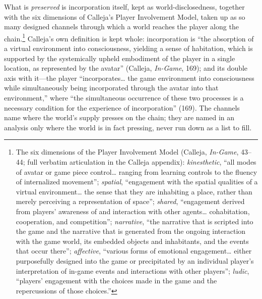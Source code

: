\documentclass{article}
\begin{document}
What is \textit{preserved} is incorporation itself, kept as world-disclosedness, together with the six dimensions of Calleja's Player Involvement Model, taken up as so many designed channels through which a world reaches the player along the chain.\footnote{The six dimensions of the Player Involvement Model (Calleja, \textit{In-Game}, 43--44; full verbatim articulation in the Calleja appendix): \textit{kinesthetic}, ``all modes of avatar or game piece control\ldots{} ranging from learning controls to the fluency of internalized movement''; \textit{spatial}, ``engagement with the spatial qualities of a virtual environment\ldots{} the sense that they are inhabiting a place, rather than merely perceiving a representation of space''; \textit{shared}, ``engagement derived from players' awareness of and interaction with other agents\ldots{} cohabitation, cooperation, and competition''; \textit{narrative}, ``the narrative that is scripted into the game and the narrative that is generated from the ongoing interaction with the game world, its embedded objects and inhabitants, and the events that occur there''; \textit{affective}, ``various forms of emotional engagement\ldots{} either purposefully designed into the game or precipitated by an individual player's interpretation of in-game events and interactions with other players''; \textit{ludic}, ``players' engagement with the choices made in the game and the repercussions of those choices.''} Calleja's own definition is kept whole: incorporation is ``the absorption of a virtual environment into consciousness, yielding a sense of habitation, which is supported by the systemically upheld embodiment of the player in a single location, as represented by the avatar'' (Calleja, \textit{In-Game}, 169); and its double axis with it---the player ``incorporates\ldots{} the game environment into consciousness while simultaneously being incorporated through the avatar into that environment,'' where ``the simultaneous occurrence of these two processes is a necessary condition for the experience of incorporation'' (169). The channels name where the world's supply presses on the chain; they are named in an analysis only where the world is in fact pressing, never run down as a list to fill.
\end{document}

